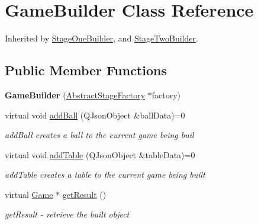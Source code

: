 \hypertarget{class_game_builder}{}\section{Game\+Builder Class Reference}
\label{class_game_builder}


Inherited by \mbox{\hyperlink{class_stage_one_builder}{Stage\+One\+Builder}}, and \mbox{\hyperlink{class_stage_two_builder}{Stage\+Two\+Builder}}.

\subsection*{Public Member Functions}
\begin{DoxyCompactItemize}
\item 
\mbox{\label{class_game_builder_a1540d75dc9f7beb42a95bbc083f86ae1}} 
{\bfseries Game\+Builder} (\mbox{\hyperlink{class_abstract_stage_factory}{Abstract\+Stage\+Factory}} $\ast$factory)
\item 
virtual void \mbox{\hyperlink{class_game_builder_a836186637bd2f7844f7dfac0135d833b}{add\+Ball}} (Q\+Json\+Object \&ball\+Data)=0
\begin{DoxyCompactList}\small\item\em add\+Ball creates a ball to the current game being buil \end{DoxyCompactList}\item 
virtual void \mbox{\hyperlink{class_game_builder_a65fb629009c18956a8d592352eda1eb5}{add\+Table}} (Q\+Json\+Object \&table\+Data)=0
\begin{DoxyCompactList}\small\item\em add\+Table creates a table to the current game being built \end{DoxyCompactList}\item 
virtual \mbox{\hyperlink{class_game}{Game}} $\ast$ \mbox{\hyperlink{class_game_builder_a490e3dbb7f8289edb2a080a3383f8607}{get\+Result}} ()
\begin{DoxyCompactList}\small\item\em get\+Result -\/ retrieve the built object \end{DoxyCompactList}\end{DoxyCompactItemize}
